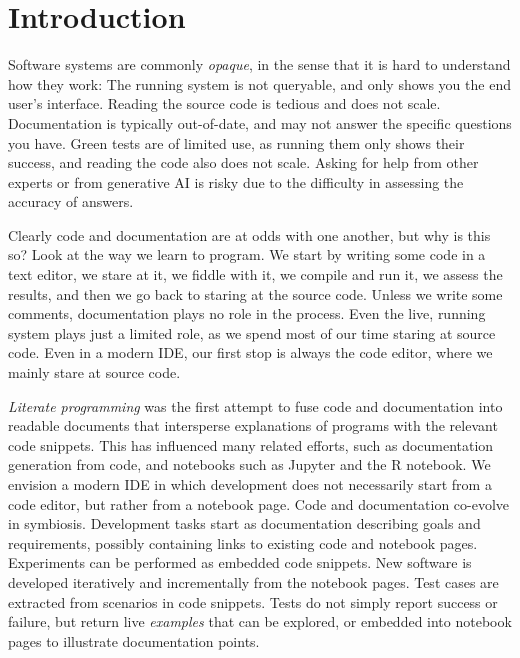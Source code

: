 \documentclass[acmsmall,screen,authorversion,nonacm]{acmart} %
\begin{document}


\maketitle

\section{Introduction}\label{sec:intro}

Software systems are commonly \emph{opaque}, in the sense that it is hard to understand how they work: The running system is not queryable, and only shows you the end user's interface. Reading the source code is tedious and does not scale. Documentation is typically out-of-date, and may not answer the specific questions you have. Green tests are of limited use, as running them only shows their success, and reading the code also does not scale. Asking for help from other experts or from generative AI is risky due to the difficulty in assessing the accuracy of answers.

Clearly code and documentation are at odds with one another, but why is this so? Look at the way we learn to program. We start by writing some code in a text editor, we stare at it, we fiddle with it, we compile and run it, we assess the results, and then we go back to staring at the source code. Unless we write some comments, documentation plays no role in the process. Even the live, running system plays just a limited role, as we spend most of our time staring at source code. Even in a modern IDE, our first stop is always the code editor, where we mainly stare at source code.

\emph{Literate programming} was the first attempt to fuse code and documentation into readable documents that intersperse explanations of programs with the relevant code snippets. This has influenced many related efforts, such as documentation generation from code, and notebooks such as Jupyter and the R notebook.
We envision a modern IDE in which development does not necessarily start from a code editor, but rather from a notebook page. Code and documentation co-evolve in symbiosis. Development tasks start as documentation describing goals and requirements, possibly containing links to existing code and notebook pages. Experiments can be performed as embedded code snippets. New software is developed iteratively and incrementally from the notebook pages. Test cases are extracted from scenarios in code snippets. Tests do not simply report success or failure, but return live \emph{examples} that can be explored, or embedded into notebook pages to illustrate documentation points.
\end{document}
